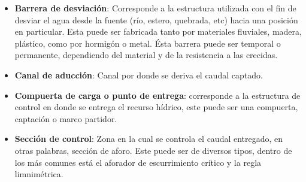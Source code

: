 \documentclass[]{article}
\begin{document}
\begin{itemize}
\item{\bfseries {Barrera de desviación}}: Corresponde a la estructura utilizada con el fin de desviar el agua desde la fuente (río, estero, quebrada, etc) hacia una posición en particular. Esta puede ser fabricada tanto por materiales fluviales, madera, plástico, como por hormigón o metal. Ésta barrera puede ser temporal o permanente, dependiendo del material y de la resistencia a las crecidas.
\item{\bfseries {Canal de aducción}}: Canal por donde se deriva el caudal captado.
\item{\bfseries {Compuerta de carga o punto de entrega}}: corresponde a la estructura de control en donde se entrega el recurso hídrico, este puede ser una compuerta, captación o marco partidor.
\item{\bfseries {Sección de control}}: Zona en la cual se controla el caudal entregado, en otras palabras, sección de aforo. Este puede ser de diversos tipos, dentro de los más comunes está el aforador de escurrimiento crítico y la regla limnimétrica.
\end{itemize}
\end{document}
